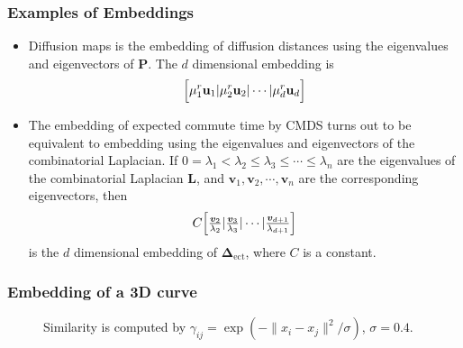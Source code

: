 \documentclass[professionalfonts,hyperref={pdfpagelabels=false,colorlinks=true,linkcolor=blue}]{beamer}
\begin{document}
\begin{frame}
  \frametitle{Examples of Embeddings}
  \begin{itemize}
    \item Diffusion maps \cite{coifman06:_diffus_maps} is the
      embedding of diffusion distances using the eigenvalues and
      eigenvectors of $\mathbf{P}$. The $d$ dimensional embedding is
      \begin{equation*}
        \Bigl[ \mu_1^{r} \mathbf{u}_1 | \mu_{2}^{r} \mathbf{u}_2 |
        \cdots | \mu_{d}^{r}  \mathbf{u}_d \Bigr]
      \end{equation*}
    \item The embedding of expected commute time by CMDS turns out
      to be equivalent to embedding using the eigenvalues and
      eigenvectors of the combinatorial
      Laplacian. If $0 = \lambda_1 < \lambda_2 \leq \lambda_3 \leq \cdots
      \leq \lambda_{n}$ are the eigenvalues of the combinatorial
      Laplacian $\mathbf{L}$, and $\bm{v}_1, \bm{v}_2, \cdots,
      \bm{v}_n$ are the corresponding eigenvectors, then
      \begin{equation*}
        C \Bigl[ \tfrac{\bm{v}_{2}}{\lambda_2} |
        \tfrac{\bm{v}_3}{\lambda_3}
        | \cdots | \tfrac{\bm{v}_{d+1}}{\lambda_{d+1}} \Bigr]
      \end{equation*}
      is the $d$ dimensional embedding of
      $\bm{\Delta}_{\mathrm{ect}}$, where $C$ is a constant.  
  \end{itemize}
\end{frame}

\begin{frame}
\frametitle{Embedding of a 3D curve}
  \subfiglabelskip=0pt
  \begin{figure}[htbp]
    \label{fig:logistic}
    \centering
    \hspace{3pt}
    \caption{Similarity is computed by $\gamma_{ij} = \exp(-\|x_i -
      x_j\|^{2}/\sigma)$, $\sigma = 0.4$.}
  \end{figure}

\end{frame}

\end{document}
